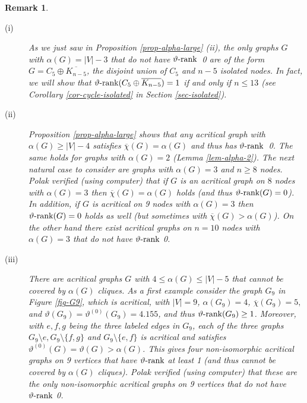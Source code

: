 \documentclass[11pt]{article}
\newtheorem{remark}[theorem]{Remark}
\numberwithin{equation}{section}
\newcommand{\rrank}{\vartheta\text{\rm -rank}}
\begin{document}
	\begin{remark}
	\begin{description}
	\item [(i)] As we just saw in Proposition \ref{prop-alpha-large} (ii),  the only graphs $G$ with  $\alpha(G)=|V|-3$  that do not have $\rrank$~0 are  of the form $G=C_5\oplus \overline{K_{n-5}}$, the disjoint union of  $C_5$ and $n-5$ isolated nodes.  In fact, we will show that $\rrank(C_5\oplus \overline {K_{n-5}})=1$  if and only if $n\le 13$ (see Corollary \ref{cor-cycle-isolated} in Section \ref{sec-isolated}).

\item [(ii)] Proposition \ref{prop-alpha-large}
shows that any acritical graph with $\alpha(G)\ge |V|-4$ satisfies $\overline \chi(G)=\alpha(G)$ and thus has $\rrank$~0. The same holds for graphs with $\alpha(G)=2$ (Lemma \ref{lem-alpha-2}). The next natural case to consider are  graphs with $\alpha(G)=3$ and $n\ge 8$ nodes.
	Polak \cite{Polak} verified (using computer) that if $G$ is an acritical graph on $8$ nodes with $\alpha(G)=3$  then $\overline \chi(G)=\alpha(G)$ holds (and thus $\rrank(G)=0$). In addition, if $G$ is acritical on 9 nodes with $\alpha(G)=3$ then $\rrank(G)=0$ holds as well (but sometimes with $\overline \chi(G)>\alpha(G)$). On the other hand there exist acritical graphs on $n=10$ nodes with $\alpha(G)=3$ that do not have $\rrank$ 0. 
	
	 \item [(iii)] There are acritical graphs $G$ with $4\le \alpha(G)\le |V|-5$ that cannot be covered by $\alpha(G)$ cliques. As a first example consider the graph $G_9$  in Figure \ref{fig-G9}, which is acritical,  with $|V|=9$, $\alpha(G_9)=4$, ${\overline{\chi}}(G_9)=5,$ and $ \vartheta(G_9)=\vartheta^{(0)}(G_9)=4.155$, and thus $\rrank(G_9)\ge 1$. Moreover,  with $e,f,g$ being the three labeled edges in $G_9$, each of the three graphs $G_9\setminus{e}, G_9\setminus{\{f,g\}}$ and $G_9\setminus{\{e,f\}}$ is acritical and satisfies $\vartheta^{(0)}(G)=\vartheta(G)>\alpha(G)$. This gives four non-isomorphic acritical graphs on 9 vertices that 
		have $\rrank$ at least 1  (and thus cannot be covered by $\alpha(G)$ cliques).  Polak \cite{Polak}  verified (using computer) that these  are  the only non-isomorphic acritical graphs on 9 vertices that do not have $\rrank$ 0.
	

\end{description}
\end{remark}
\end{document}
